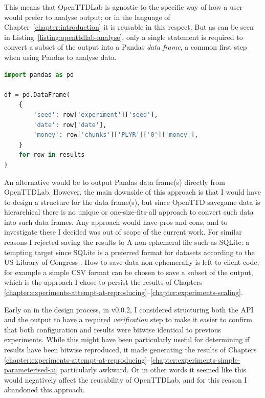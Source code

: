 \documentclass[logo,msc,dsti]{style/infthesis}    %
\begin{document}
{This means that OpenTTDLab is agnostic to the specific way of how a user would prefer to analyse output; or in the language of Chapter~\ref{chapter:introduction} it is reusable in this respect. But as can be seen in Listing~\ref{listing:openttdlab-analyse}, only a single statement is required to convert a subset of the output into a Pandas \emph{data frame}, a common first step when using Pandas to analyse data.

\begin{lstlisting}[label=listing:openttdlab-analyse,language=Python, caption={Example usage of the results of OpenTTDLab, such as those generated in \ref{listing:openttdlab}, converting them to a Pandas data frame.}]
import pandas as pd

df = pd.DataFrame(
    {
        'seed': row['experiment']['seed'],
        'date': row['date'],
        'money': row['chunks']['PLYR']['0']['money'],
    }
    for row in results
)
\end{lstlisting}
%
An alternative would be to output Pandas data frame(s) directly from OpenTTDLab. However, the main downside of this approach is that I would have to design a structure for the data frame(s), but since OpenTTD savegame data is hierarchical there is no unique or one-size-fits-all approach to convert such data into such data frames. Any approach would have pros and cons, and to investigate these I decided was out of scope of the current work. For similar reasons I rejected saving the results to A non-ephemeral file such as SQLite: a tempting target since SQLite is a preferred format for datasets according to the US Library of Congress \cite{sqlitelog}. How to save data non-ephemerally is left to client code; for example a simple CSV format can be chosen to save a subset of the output, which is the approach I chose to persist the results of Chapters \ref{chapter:experiments-attempt-at-reproducing}--\ref{chapter:experiments-scaling}.

Early on in the design process, in v0.0.2, I considered structuring both the API and the output to have a required \emph{verification} step to make it easier to confirm that both configuration and results were bitwise identical to previous experiments. While this might have been particularly useful for determining if results have been bitwise reproduced, it made generating the results of Chapters \ref{chapter:experiments-attempt-at-reproducing}--\ref{chapter:experiments-simple-parameterised-ai} particularly awkward. Or in other words it seemed like this would negatively affect the reusability of OpenTTDLab, and for this reason I abandoned this approach.


}
\end{document}
